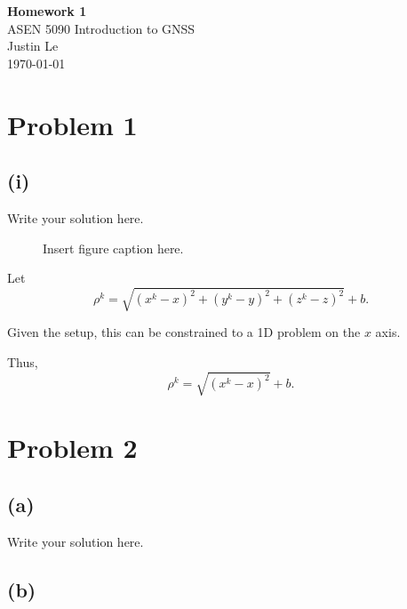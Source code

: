 \documentclass[11pt]{article}
\begin{document}
\begin{center}
    {\Large \textbf{Homework 1}}\\[0.5em]
    {\large ASEN 5090 Introduction to GNSS}\\[0.5em]
    Justin Le\\
    \today
\end{center}

\vspace{1em}


\section*{Problem 1}

\subsection*{(i)}

Write your solution here.

\begin{figure}[htbp]
    \centering
    \caption{Insert figure caption here.}
    \label{fig:problem1}
\end{figure}

Let
\[
\rho^{k}
=
\sqrt{
(x^{k}-x)^2
+
(y^{k}-y)^2
+
(z^{k}-z)^2
}
+b.
\]

Given the setup, this can be constrained to a 1D problem on the $x$ axis.

Thus,
\[
\rho^{k}
=
\sqrt{(x^{k}-x)^2}
+b.
\]


\section*{Problem 2}

\subsection*{(a)}

Write your solution here.

\subsection*{(b)}
\end{document}

